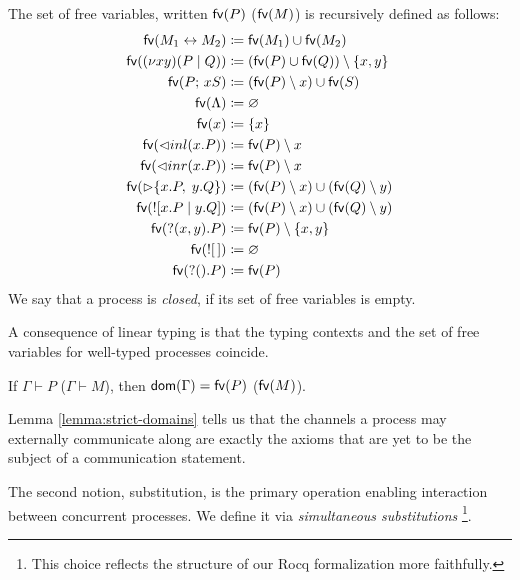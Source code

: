 \begin{definition} \label{def:pi-fd:free-vars}
  The set of free variables, written $\mathsf{fv}(P)$ ($\mathsf{fv}(M)$) is recursively defined
  as follows:
  {\allowdisplaybreaks
  \begin{align*}
    \mathsf{fv}(M_1 \leftrightarrow M_2) &\coloneq \mathsf{fv}(M_1) \cup \mathsf{fv}(M_2) \\
    \mathsf{fv}((\nu x y)(P \mid Q)) &\coloneq (\mathsf{fv}(P) \cup \mathsf{fv}(Q)) \setminus \{x, y\} \\
    \mathsf{fv}(P ;\, xS) &\coloneq (\mathsf{fv}(P) \setminus x) \cup \mathsf{fv}(S) \\
    \mathsf{fv}(\Lambda) &\coloneq \varnothing \\
    \mathsf{fv}(x) &\coloneq \{x\} \\
    \mathsf{fv}(\lhd inl(x.P)) &\coloneq \mathsf{fv}(P) \setminus x \\
    \mathsf{fv}(\lhd inr(x.P)) &\coloneq \mathsf{fv}(P) \setminus x \\
    \mathsf{fv}(\rhd \{ x.P,\; y.Q \}) &\coloneq (\mathsf{fv}(P) \setminus x) \cup (\mathsf{fv}(Q) \setminus y) \\
    \mathsf{fv}(! [x.P \mid y.Q]) &\coloneq (\mathsf{fv}(P) \setminus x) \cup (\mathsf{fv}(Q) \setminus y) \\
    \mathsf{fv}(? (x, y).P) &\coloneq \mathsf{fv}(P) \setminus \{x, y\} \\
    \mathsf{fv}(! [\,]) &\coloneq \varnothing \\
    \mathsf{fv}(? ().P) &\coloneq \mathsf{fv}(P)
  \end{align*}
  }
  We say that a process is \emph{closed}, if its set of free variables is empty.
\end{definition}

A consequence of linear typing is that the typing contexts and
the set of free variables for well-typed processes coincide.

\begin{lemma} \label{lemma:strict-domains}
  If $\Gamma \vdash P$ ($\Gamma \vdash M$), then $\mathsf{dom}(\Gamma) = \mathsf{fv}(P)$ ($\mathsf{fv}(M)$).
\end{lemma}

Lemma \ref{lemma:strict-domains} tells us that the channels a process
may externally communicate along are exactly the axioms that are yet to be the subject
of a communication statement.

The second notion, substitution, is the primary operation enabling
interaction between concurrent processes. We define it via
\emph{simultaneous substitutions} \cite{Stoughton1988:SimultaneousSubst} \footnote{This choice
reflects the structure of our Rocq formalization more faithfully.}.

